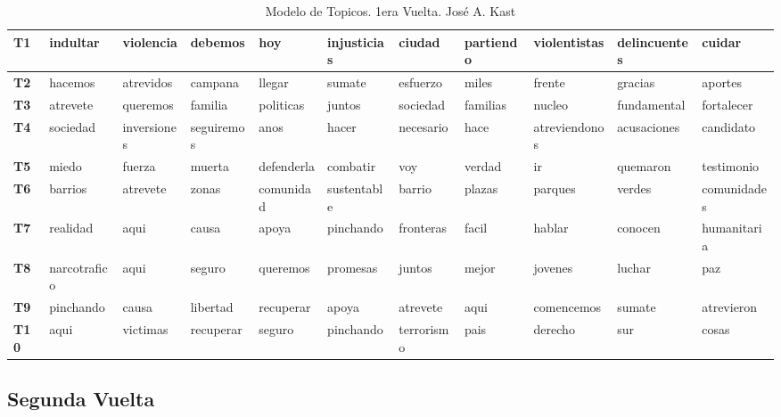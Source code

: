 \documentclass[
  10pt,
  letterpaper,
]{report}
\begin{document}
\begin{table}[!h]

\caption{\label{tab:Tabla6_kast}Modelo de Topicos. 1era Vuelta. José A. Kast}
\centering
\fontsize{6}{8}\selectfont
\begin{tabular}[t]{>{\raggedright\arraybackslash}p{0.08in}|>{\raggedright\arraybackslash}p{0.4in}|>{\raggedright\arraybackslash}p{0.4in}|>{\raggedright\arraybackslash}p{0.4in}|>{\raggedright\arraybackslash}p{0.4in}|>{\raggedright\arraybackslash}p{0.4in}|>{\raggedright\arraybackslash}p{0.4in}|>{\raggedright\arraybackslash}p{0.4in}|>{\raggedright\arraybackslash}p{0.4in}|>{\raggedright\arraybackslash}p{0.4in}|l}
\hline
T1 & indultar & violencia & debemos & hoy & injusticias & ciudad & partiendo & violentistas & delincuentes & cuidar\\
\hline
\textbf{T2} & hacemos & atrevidos & campana & llegar & sumate & esfuerzo & miles & frente & gracias & aportes\\
\hline
\textbf{T3} & atrevete & queremos & familia & politicas & juntos & sociedad & familias & nucleo & fundamental & fortalecer\\
\hline
\textbf{T4} & sociedad & inversiones & seguiremos & anos & hacer & necesario & hace & atreviendonos & acusaciones & candidato\\
\hline
\textbf{T5} & miedo & fuerza & muerta & defenderla & combatir & voy & verdad & ir & quemaron & testimonio\\
\hline
\textbf{T6} & barrios & atrevete & zonas & comunidad & sustentable & barrio & plazas & parques & verdes & comunidades\\
\hline
\textbf{T7} & realidad & aqui & causa & apoya & pinchando & fronteras & facil & hablar & conocen & humanitaria\\
\hline
\textbf{T8} & narcotrafico & aqui & seguro & queremos & promesas & juntos & mejor & jovenes & luchar & paz\\
\hline
\textbf{T9} & pinchando & causa & libertad & recuperar & apoya & atrevete & aqui & comencemos & sumate & atrevieron\\
\hline
\textbf{T10} & aqui & victimas & recuperar & seguro & pinchando & terrorismo & pais & derecho & sur & cosas\\
\hline
\end{tabular}
\end{table}

\hypertarget{segunda-vuelta}{%
\subsection{Segunda Vuelta}\label{segunda-vuelta}}
\end{document}
